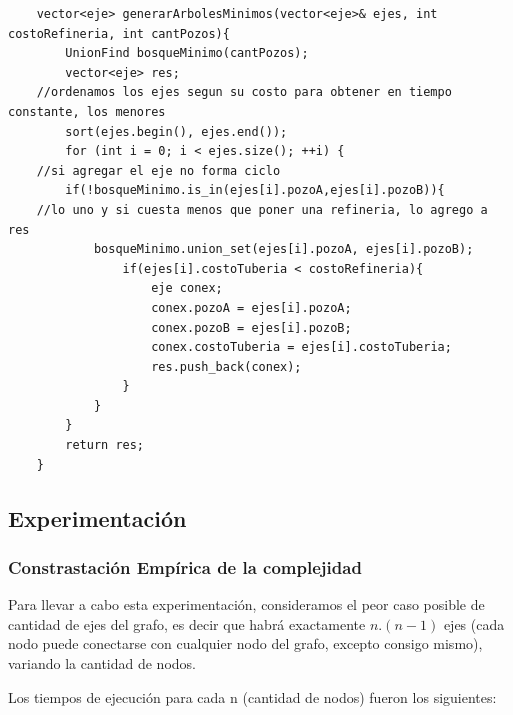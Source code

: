 	\begin{codesnippet}
	\begin{verbatim}
    vector<eje> generarArbolesMinimos(vector<eje>& ejes, int costoRefineria, int cantPozos){
        UnionFind bosqueMinimo(cantPozos);
        vector<eje> res;
    //ordenamos los ejes segun su costo para obtener en tiempo constante, los menores
        sort(ejes.begin(), ejes.end());
        for (int i = 0; i < ejes.size(); ++i) {
    //si agregar el eje no forma ciclo
        if(!bosqueMinimo.is_in(ejes[i].pozoA,ejes[i].pozoB)){
    //lo uno y si cuesta menos que poner una refineria, lo agrego a res
            bosqueMinimo.union_set(ejes[i].pozoA, ejes[i].pozoB);
                if(ejes[i].costoTuberia < costoRefineria){
                    eje conex;
                    conex.pozoA = ejes[i].pozoA;
                    conex.pozoB = ejes[i].pozoB;
                    conex.costoTuberia = ejes[i].costoTuberia;
                    res.push_back(conex);
                }
            }
        }
        return res;
    }
	\end{verbatim}
	\end{codesnippet}

\subsection{Experimentaci\'on}
\subsubsection{Constrastaci\'on Emp\'irica de la complejidad}
	Para llevar a cabo esta experimentaci\'on, consideramos el peor caso posible de cantidad de ejes del grafo, es decir que habr\'a exactamente $n.(n-1)$ ejes (cada nodo puede conectarse con cualquier nodo del grafo, excepto consigo mismo), variando la cantidad de nodos.

	Los tiempos de ejecuci\'on para cada n (cantidad de nodos) fueron los siguientes:


